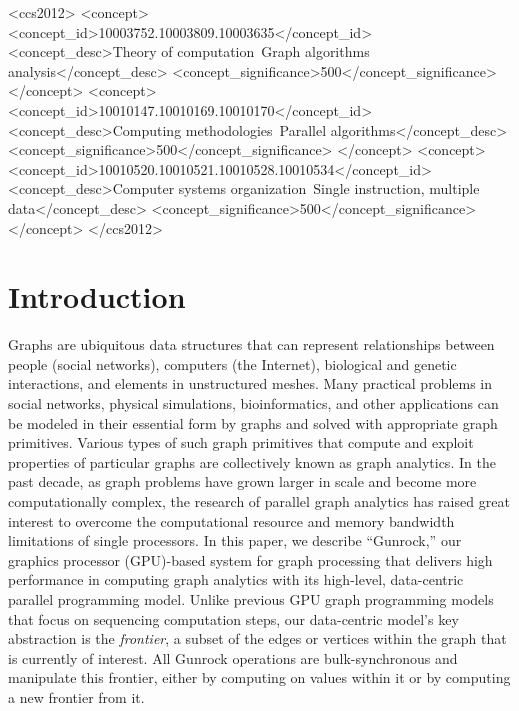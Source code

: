 \documentclass[format=acmsmall,review=false,screen=true]{acmart}
\begin{document}
%
%
\begin{CCSXML}
<ccs2012>
<concept>
<concept_id>10003752.10003809.10003635</concept_id>
<concept_desc>Theory of computation~Graph algorithms analysis</concept_desc>
<concept_significance>500</concept_significance>
</concept>
<concept>
<concept_id>10010147.10010169.10010170</concept_id>
<concept_desc>Computing methodologies~Parallel algorithms</concept_desc>
<concept_significance>500</concept_significance>
</concept>
<concept>
<concept_id>10010520.10010521.10010528.10010534</concept_id>
<concept_desc>Computer systems organization~Single instruction, multiple data</concept_desc>
<concept_significance>500</concept_significance>
</concept>
</ccs2012>
\end{CCSXML}

%
%

\maketitle

\section{Introduction}
\label{sec:intro}
Graphs are ubiquitous data structures that can represent relationships
between people (social networks), computers (the Internet), biological
and genetic interactions, and elements in unstructured meshes. Many
practical problems in social networks, physical simulations,
bioinformatics, and other applications can be modeled in their
essential form by graphs and solved with appropriate graph primitives.
Various types of such graph primitives that compute and exploit
properties of particular graphs are collectively known as graph
analytics. In the past decade, as graph problems have grown larger in
scale and become more computationally complex, the research of
parallel graph analytics has raised great interest to overcome the
computational resource and memory bandwidth limitations of single
processors. In this paper, we describe ``Gunrock,'' our graphics
processor (GPU)-based system for graph processing that delivers high
performance in computing graph analytics with its high-level,
data-centric parallel programming model. Unlike previous GPU graph
programming models that focus on sequencing computation steps, our
data-centric model's key abstraction is the \emph{frontier}, a subset
of the edges or vertices within the graph that is currently of
interest. All Gunrock operations are bulk-synchronous and manipulate
this frontier, either by computing on values within it or by computing
a new frontier from it.
\end{document}
